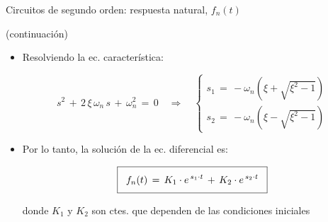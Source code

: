 \documentclass[aspectratio=169, usenames,svgnames,dvipsnames]{beamer}
\begin{document}

\begin{frame}{Circuitos de segundo orden: \hspace{3mm}respuesta natural, \hspace{3mm}$f_n(t)$}

    \vspace{-2mm}
    (continuación)
    
    \vspace{2mm}

	\begin{itemize}
    	\item Resolviendo la \alert{ec. característica}:     
    
        \vspace{-3mm}
    	\begin{equation*}
    	    s^2 \,+\, 2\,\xi\,\omega_n\,s \,+\, \omega_n^2 \,=\, 0 \quad\Rightarrow\quad
    	    \begin{cases}
    	       s_1 \,=\, -\omega_n\left(\xi+\sqrt{\xi^2-1} \right)\\[9pt]
                s_2 \,=\, -\omega_n\left(\xi-\sqrt{\xi^2-1} \right)
    	    \end{cases}
    	\end{equation*}

        \vspace{3mm}
        \item Por lo tanto, la \alert{solución de la ec. diferencial} es:

        \vspace{1mm}
        \begin{equation*}
           \boxed{\;\; \vphantom{\frac{1}{1}} f_n(t) \,=\, K_1 \cdot e^{\, s_1\cdot t} \,+\, K_2 \cdot e^{\, s_2\cdot t} \;\;}
        \end{equation*}

        \vspace{3mm}
        
        \centering donde $K_1$ y $K_2$ son ctes. que dependen de las \alert{condiciones iniciales}
        
	\end{itemize}
\end{frame}

\end{document}
